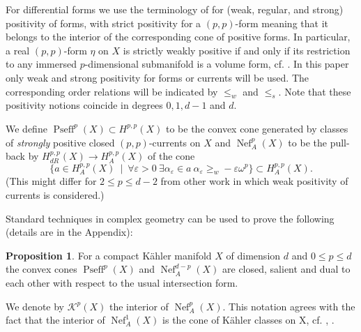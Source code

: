 \documentclass[a4,reqno]{amsart}
\theoremstyle{definition}
\newtheorem{proposition}[theorem]{Proposition}
\def\cK{\mathcal K}
\DeclareMathOperator{\Pseff}{Pseff}
\DeclareMathOperator{\Nef}{Nef}
\numberwithin{equation}{section}
\begin{document}
For differential forms we use the terminology of \cite{HarveyKnapp} for (weak, regular, and strong) positivity of forms, with strict positivity for a $(p,p)$-form meaning that it belongs to the interior of the corresponding cone of positive forms. %
In particular, a real $(p,p)$-form $\eta$ on $X$ is strictly weakly positive if and only if its restriction to any immersed $p$-dimensional submanifold is a volume form, cf. \cite[p.~46]{HarveyKnapp}. In this paper only weak and strong positivity for forms or currents will be used. The corresponding order relations will be indicated by $\le_w$ and $\le_s$.  Note that these positivity notions coincide in degrees $0,1,d-1$ and $d$.

We define $\Pseff^p(X)\subset H^{p,p}(X)$ to be the convex cone generated by classes of {\em strongly} positive closed $(p,p)$-currents on $X$
and $\Nef^p_A(X)$ to be the pull-back by $H^{p,p}_{dR}(X)\to H^{p,p}_A(X)$ of the cone
$$\{ a\in  H^{p,p}_A(X) \ \mid \ \forall \varepsilon>0 \ \exists \alpha_\varepsilon\in a \ \alpha_\varepsilon\ge_w-\varepsilon\omega^p\}\subset H^{p,p}_A(X). $$
(This might differ for $2\le p \le d-2$ from other work in which weak positivity of currents is considered.) 

Standard techniques in complex geometry can be used to prove the following (details are in the Appendix):

\begin{proposition}\label{prop:cones}
    For a compact K\"ahler manifold $X$ of dimension $d$ and $0\le p\le d$ the convex cones $\Pseff^p(X)$ and $\Nef^{d-p}_A(X)$ are closed, salient and dual to each other with respect to the usual intersection form.  
\end{proposition}

We denote by $\cK^p(X)$ the interior of $\Nef^p_A(X)$. This notation agrees with the  fact that the interior of $\Nef^1_A(X)$ is the cone of K\"ahler classes on X, cf. \cite[Section 1]{DemaillyPaun}, \cite[Proposition 2.7]{ChioseRasdeaconuSuvaina2019}.
\end{document}
